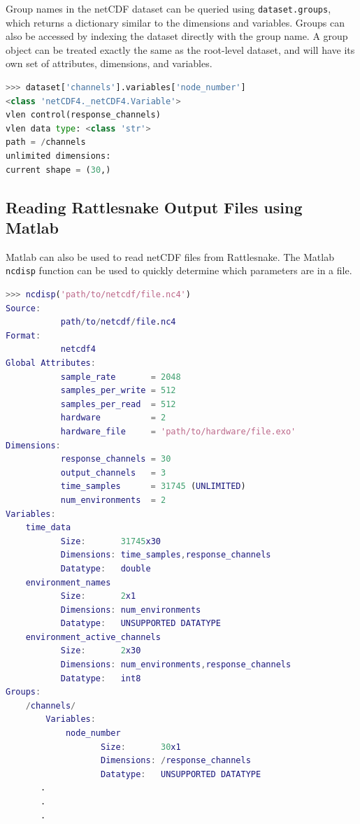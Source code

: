 \documentclass[pdf,12pt,report]{SANDreport}
\newcommand{\inlineCode}{\lstinline[basicstyle=\bfseries\ttfamily]}
\begin{document}
    Group names in the netCDF dataset can be queried using \inlineCode{dataset.groups}, which returns a dictionary similar to the dimensions and variables.  Groups can also be accessed by indexing the dataset directly with the group name.  A group object can be treated exactly the same as the root-level dataset, and will have its own set of attributes, dimensions, and variables.
    
\begin{lstlisting}[language=Python,numbers=none]
>>> dataset['channels'].variables['node_number']
<class 'netCDF4._netCDF4.Variable'>
vlen control(response_channels)
vlen data type: <class 'str'>
path = /channels
unlimited dimensions: 
current shape = (30,)
\end{lstlisting}
    
    \subsection{Reading Rattlesnake Output Files using Matlab}
    Matlab can also be used to read netCDF files from Rattlesnake.  The Matlab \inlineCode{ncdisp} function can be used to quickly determine which parameters are in a file.
    
\begin{lstlisting}[language=Matlab,numbers=none]
>>> ncdisp('path/to/netcdf/file.nc4')
Source:
           path/to/netcdf/file.nc4
Format:
           netcdf4
Global Attributes:
           sample_rate       = 2048
           samples_per_write = 512
           samples_per_read  = 512
           hardware          = 2
           hardware_file     = 'path/to/hardware/file.exo'
Dimensions:
           response_channels = 30
           output_channels   = 3
           time_samples      = 31745 (UNLIMITED)
           num_environments  = 2
Variables:
    time_data                  
           Size:       31745x30
           Dimensions: time_samples,response_channels
           Datatype:   double
    environment_names          
           Size:       2x1
           Dimensions: num_environments
           Datatype:   UNSUPPORTED DATATYPE
    environment_active_channels
           Size:       2x30
           Dimensions: num_environments,response_channels
           Datatype:   int8
Groups:
    /channels/
        Variables:
            node_number      
                   Size:       30x1
                   Dimensions: /response_channels
                   Datatype:   UNSUPPORTED DATATYPE
       .            
       .
       .
\end{lstlisting}
\end{document}
